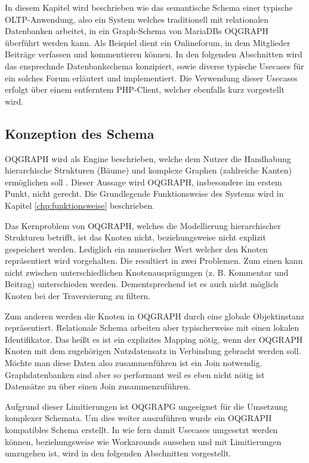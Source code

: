 In diesem Kapitel wird beschrieben wie das semantische Schema einer typische OLTP-Anwendung, also ein System welches traditionell mit relationalen Datenbanken arbeitet, in ein Graph-Schema von MariaDBs OQGRAPH überführt werden kann. Als Beispiel dient ein Onlineforum, in dem Mitglieder Beiträge verfassen und kommentieren können. In den folgenden Abschnitten wird das ensprechnde Datenbankschema konzipiert, sowie diverse typische Usecases für ein solches Forum erläutert und implementiert. Die Verwendung dieser Usecases erfolgt über einem entferntem PHP-Client, welcher ebenfalls kurz vorgestellt wird.

\subsection{Konzeption des Schema}
OQGRAPH wird als Engine beschrieben, welche dem Nutzer die Handhabung hierarchische Strukturen (Bäume) und komplexe Graphen (zahlreiche Kanten) ermöglichen soll \cite{oqgraph}. Dieser Aussage wird OQGRAPH, insbesondere im erstem Punkt, nicht gerecht. Die Grundlegende Funktionsweise des Systems wird in Kapitel \ref{chp:funktionsweise} beschrieben.

Das Kernproblem von OQGRAPH, welches die Modellierung hierarchischer Strukturen betrifft, ist das Knoten nicht, beziehungsweise nicht explizit gespeichert werden. Lediglich ein numerischer Wert welcher den Knoten repräsentiert wird vorgehalten. Die resultiert in zwei Problemen. Zum einen kann nicht zwischen unterschiedlichen Knotenausprägungen (z. B. Kommentar und Beitrag) unterschieden werden. Dementsprechend ist es auch nicht möglich Knoten bei der Traversierung zu filtern. 

Zum anderen werden die Knoten in OQGRAPH durch eine globale Objektinstanz repräsentiert. Relationale Schema arbeiten aber typischerweise mit einen lokalen Identifikator. Das heißt es ist ein explizites Mapping nötig, wenn der OQGRAPH Knoten mit dem zugehörigen Nutzdatensatz in Verbindung gebracht werden soll. Möchte man diese Daten also zusammenführen ist ein Join notwendig. Graphdatenbanken sind aber so performant weil es eben nicht nötig ist Datensätze zu über einen Join zusammenzuführen.

Aufgrund dieser Limitierungen ist OQGRAPG ungeeignet für die Umsetzung komplexer Schemata. Um dies weiter auszuführen wurde ein OQGRAPH kompatibles Schema erstellt. In wie fern damit Usecases umgesetzt werden können, beziehungsweise wie Workarounds aussehen und mit Limitierungen umzugehen ist, wird in den folgenden Abschnitten vorgestellt.

